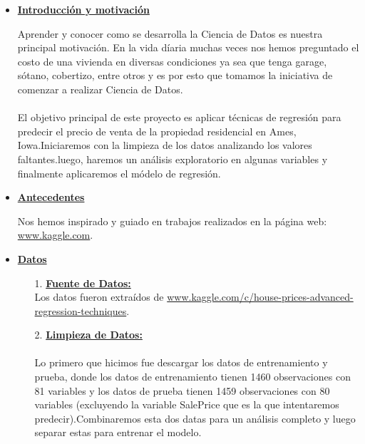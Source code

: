 \documentclass{report}
\begin{document}
\begin{itemize}
\item \textbf{\large{\underline{Introducción y motivación}}}
\vspace{2mm}

Aprender y conocer como se desarrolla la Ciencia de Datos es nuestra principal motivación. En la vida díaria muchas veces nos hemos preguntado el costo de una vivienda en diversas condiciones ya sea que tenga garage, sótano, cobertizo, entre otros y es por esto que tomamos la iniciativa de comenzar a realizar Ciencia de Datos.\\ \\
El objetivo principal de este proyecto es aplicar técnicas de regresión para predecir el precio de venta de la propiedad residencial en Ames, Iowa.Iniciaremos con la limpieza de los datos analizando los valores faltantes.luego, haremos un análisis exploratorio en algunas variables y finalmente aplicaremos el módelo de regresión.\\

\item \textbf{\large{\underline{Antecedentes}}}
\vspace{2mm}

Nos hemos inspirado y guiado en trabajos realizados en la página web: \url{www.kaggle.com}.\\

\item \textbf{\large{\underline{Datos}}}
\vspace{2mm}

\begin{itemize}
\item[1.] \textbf{\underline{Fuente de Datos:}}\\

Los datos fueron extraídos de \url{www.kaggle.com/c/house-prices-advanced-regression-techniques}.\\

\item[2.] \textbf{\underline{Limpieza de Datos:}}\\ \\
Lo primero que hicimos fue descargar los datos de entrenamiento y prueba, donde los datos de entrenamiento tienen 1460 observaciones con 81 variables y los datos de prueba tienen 1459 observaciones con 80 variables (excluyendo la variable SalePrice que es la que intentaremos predecir).Combinaremos esta dos datas para un análisis completo y luego separar estas para entrenar el modelo.\\


\end{itemize}
\end{itemize}
\end{document}
